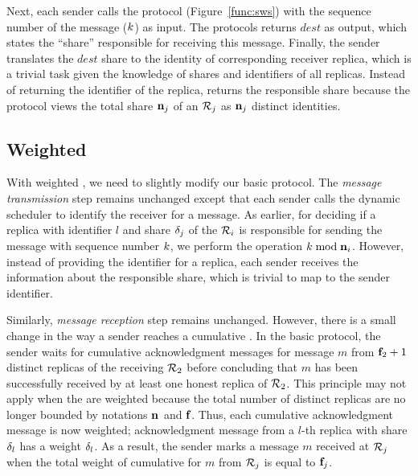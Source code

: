 Next, each sender calls the \SWS{} protocol (Figure~\ref{func:sws})
with the sequence number of the message ($k$) as input.
The \SWS{} protocols returns $dest$ as output, which states the ``share''
responsible for receiving this message.
Finally, the sender translates the $dest$ share to the identity of corresponding receiver replica, 
which is a trivial task given the knowledge of shares and identifiers of all replicas.
Instead of returning the identifier of the replica, \SWS{} returns the responsible 
share because the protocol views the total share $\textbf{n}_{j}$ of an \RSM{} $\mathcal{R}_{j}$ as $\textbf{n}_{j}$ distinct identities.


\subsection{Weighted \Scrooge{}}
With weighted , we need to slightly modify our basic \Scrooge{} protocol.
The {\em message transmission} step remains unchanged except that each sender calls the dynamic \SWS{} scheduler  
to identify the receiver for a message. 
As earlier, for deciding if a replica with identifier $l$ and share ${\delta}_{j}$ 
of the \RSM{} $\mathcal{R}_{i}$ is responsible for sending the message with sequence number $k$, 
we perform the operation $k \bmod \textbf{n}_{i}$.
However, instead of providing the identifier for a replica, each sender receives the information about 
the responsible share, which is trivial to map to the sender identifier.

Similarly, {\em message reception} step remains unchanged.
However, there is a small change in the way a sender reaches a cumulative \quack{}. 
In the basic \Scrooge{} protocol, the sender waits for cumulative acknowledgment 
messages for message $m$ from $\textbf{f}_{2}+1$ distinct replicas of the receiving \RSM{} $\mathcal{R}_{2}$ 
before concluding that $m$ has been successfully received by at least one honest 
replica of $\mathcal{R}_{2}$.
This principle may not apply when the  are weighted because the total number of 
distinct replicas are no longer bounded by notations $\textbf{n}_{}$ and $\textbf{f}_{}$. 
Thus, each cumulative acknowledgment message is now weighted; 
acknowledgment message from a $l$-th replica with share ${\delta}_{l}$ has a weight ${\delta}_{l}$.
As a result, the sender marks a message $m$ received at \RSM{} $\mathcal{R}_{j}$ when 
the total weight of cumulative \quack{} for $m$ from $\mathcal{R}_{j}$ is equal to $\textbf{f}_{j}$.




